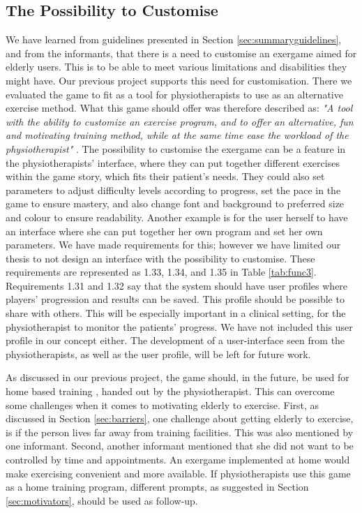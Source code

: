 \subsection{The Possibility to Customise}
We have learned from guidelines presented in Section \ref{sec:summaryguidelines}, and from the informants, that there is a need to customise an exergame aimed for elderly users. This is to be able to meet various limitations and disabilities they might have. Our previous project \cite{project} supports this need for customisation. There we evaluated the game to fit as a tool for physiotherapists to use as an alternative exercise method. What this game should offer was therefore described as: \emph{"A tool with the ability to customize an exercise program, and to offer an alternative, fun and motivating training method, while at the same time ease the workload of the physiotherapist"} \cite{project}. The possibility to customise the exergame can be a feature in the physiotherapists' interface, where they can put together different exercises within the game story, which fits their patient's needs. They could also set parameters to adjust difficulty levels according to progress, set the pace in the game to ensure mastery, and also change font and background to preferred size and colour to ensure readability. Another example is for the user herself to have an interface where she can put together her own program and set her own parameters. We have made requirements for this; however we have limited our thesis to not design an interface with the possibility to customise. These requirements are represented as 1.33, 1.34, and 1.35 in Table \ref{tab:func3}. Requirements 1.31 and 1.32 say that the system should have user profiles where players' progression and results can be saved. This profile should be possible to share with others. This will be especially important in a clinical setting, for the physiotherapist to monitor the patients' progress. We have not included this user profile in our concept either. The development of a user-interface seen from the physiotherapists, as well as the user profile, will be left for future work. 

As discussed in our previous project, the game should, in the future, be used for home based training \cite{project}, handed out by the physiotherapist. This can overcome some challenges when it comes to motivating elderly to exercise. First, as discussed in Section \ref{sec:barriers}, one challenge about getting elderly to exercise, is if the person lives far away from training facilities. This was also mentioned by one informant. Second, another informant mentioned that she did not want to be controlled by time and appointments. An exergame implemented at home would make exercising convenient and more available. If physiotherapists use this game as a home training program, different prompts, as suggested in Section \ref{sec:motivators}, should be used as follow-up. 

